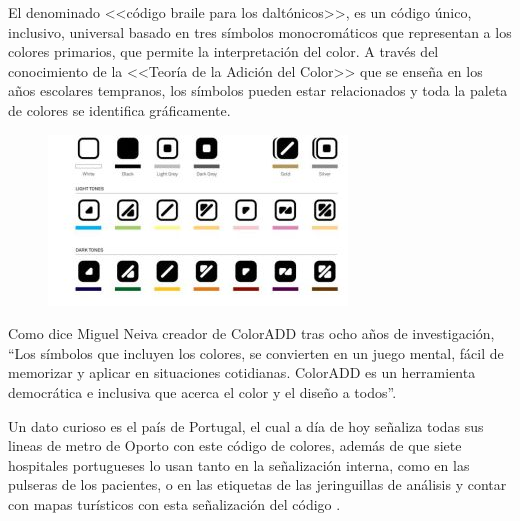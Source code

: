 \documentclass[10pt]{article}
\begin{document}
El denominado <<código braile para los daltónicos>>, es un código único, inclusivo, universal basado en tres símbolos monocromáticos que representan a los colores primarios, que permite la interpretación del color. A través del conocimiento de la <<Teoría de la Adición del Color>> que se enseña en los años escolares tempranos, los símbolos pueden estar relacionados y toda la paleta de colores se identifica gráficamente\cite{IEEEreferencias:Ref17}.
\newline
\begin{figure}[H]
	\begin{center}
\includegraphics[scale = 0.85]{Imagenes/1437744306_549219_1437997332_sumario_normal.jpg}
	\end{center} 
\end{figure}

Como dice Miguel Neiva creador de ColorADD tras ocho años de investigación, “Los símbolos que incluyen los colores, se convierten en un juego mental, fácil de memorizar y aplicar en situaciones cotidianas. ColorADD es un herramienta democrática e inclusiva que acerca el color y el diseño a todos”\cite{IEEEreferencias:Ref17}. \newline

Un dato curioso es el país de Portugal, el cual a día de hoy señaliza todas sus lineas de metro de Oporto con este código de colores, además de que siete hospitales portugueses lo usan tanto en la señalización interna, como en las pulseras de los pacientes, o en las etiquetas de las jeringuillas de análisis y contar con mapas turísticos con esta señalización del código \cite{IEEEreferencias:Ref17}.
\end{document}
